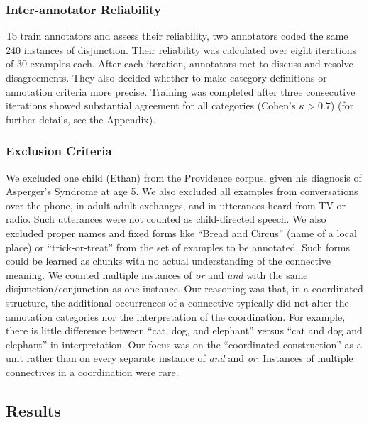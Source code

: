 \documentclass[
  ,man,floatsintext]{apa6}
\begin{document}
\hypertarget{inter-annotator-reliability}{%
\subsubsection{Inter-annotator Reliability}\label{inter-annotator-reliability}}

To train annotators and assess their reliability, two annotators coded the same 240 instances of disjunction. Their reliability was calculated over eight iterations of 30 examples each. After each iteration, annotators met to discuss and resolve disagreements. They also decided whether to make category definitions or annotation criteria more precise. Training was completed after three consecutive iterations showed substantial agreement for all categories (Cohen's \(\kappa > 0.7\)) (for further details, see the Appendix).

\hypertarget{exclusion-criteria-1}{%
\subsubsection{Exclusion Criteria}\label{exclusion-criteria-1}}

We excluded one child (Ethan) from the Providence corpus, given his diagnosis of Asperger's Syndrome at age 5. We also excluded all examples from conversations over the phone, in adult-adult exchanges, and in utterances heard from TV or radio. Such utterances were not counted as child-directed speech. We also excluded proper names and fixed forms like ``Bread and Circus'' (name of a local place) or ``trick-or-treat'' from the set of examples to be annotated. Such forms could be learned as chunks with no actual understanding of the connective meaning. We counted multiple instances of \emph{or} and \emph{and} with the same disjunction/conjunction as one instance. Our reasoning was that, in a coordinated structure, the additional occurrences of a connective typically did not alter the annotation categories nor the interpretation of the coordination. For example, there is little difference between ``cat, dog, and elephant'' versus ``cat and dog and elephant'' in interpretation. Our focus was on the ``coordinated construction'' as a unit rather than on every separate instance of \emph{and} and \emph{or}. Instances of multiple connectives in a coordination were rare.

\hypertarget{results}{%
\subsection{Results}\label{results}}
\end{document}

